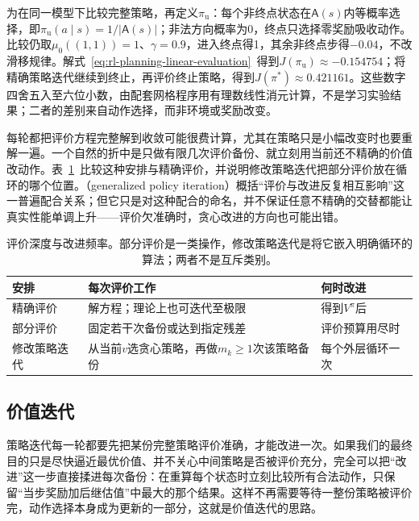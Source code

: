 为在同一模型下比较完整策略，再定义$\pi_{\mathrm u}$：每个非终点状态在$\mathsf A(s)$内等概率选择，即$\pi_{\mathrm u}(a\mid s)=1/|\mathsf A(s)|$；非法方向概率为0，终点只选择零奖励吸收动作。比较仍取$\mu_0((1,1))=1$、$\gamma=0.9$，进入终点得1，其余非终点步得$-0.04$，不改滑移规律。解式~\eqref{eq:rl-planning-linear-evaluation}~得到$J(\pi_{\mathrm u})\approx-0.154754$；将精确策略迭代继续到终止，再评价终止策略，得到$J(\pi^*)\approx0.421161$。这些数字四舍五入至六位小数，由配套网格程序用有理数线性消元计算，不是学习实验结果；二者的差别来自动作选择，而非环境或奖励改变。

每轮都把评价方程完整解到收敛可能很费计算，尤其在策略只是小幅改变时也要重解一遍。一个自然的折中是只做有限几次评价备份、就立刻用当前还不精确的价值改动作。表~\ref{tab:rl-planning-evaluation-schedules}~比较这种安排与精确评价，并说明修改策略迭代把部分评价放在循环的哪个位置。（generalized policy iteration）概括“评价与改进反复相互影响”这一普遍配合关系；但它只是对这种配合的命名，并不保证任意不精确的交替都能让真实性能单调上升——评价欠准确时，贪心改进的方向也可能出错。

\begin{table}[htbp]
 \centering
 \small
 \begin{tabularx}{\linewidth}{@{}l>{\raggedright\arraybackslash}X>{\raggedright\arraybackslash}X@{}}
  \toprule
  安排 & 每次评价工作 & 何时改进\\
  \midrule
  精确评价 & 解方程；理论上也可迭代至极限 & 得到$V^\pi$后\\
  部分评价 & 固定若干次备份或达到指定残差 & 评价预算用尽时\\
  修改策略迭代 & 从当前$v$选贪心策略，再做$m_k\geq1$次该策略备份 & 每个外层循环一次\\
  \bottomrule
 \end{tabularx}
 \caption{评价深度与改进频率。部分评价是一类操作，修改策略迭代是将它嵌入明确循环的算法；两者不是互斥类别。}
 \label{tab:rl-planning-evaluation-schedules}
\end{table}

\subsection{价值迭代}
\label{sec:rl-planning-value-iteration}

策略迭代每一轮都要先把某份完整策略评价准确，才能改进一次。如果我们的最终目的只是尽快逼近最优价值、并不关心中间策略是否被评价充分，完全可以把“改进”这一步直接揉进每次备份：在重算每个状态时立刻比较所有合法动作，只保留“当步奖励加后继估值”中最大的那个结果。这样不再需要等待一整份策略被评价完，动作选择本身成为更新的一部分，这就是价值迭代的思路。

